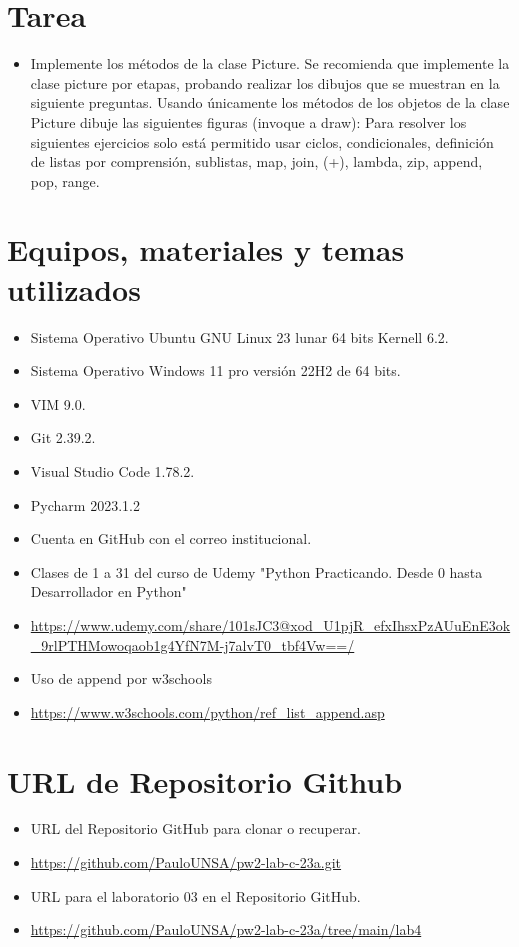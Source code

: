 \documentclass{article}
\begin{document}
	\section{Tarea}
	\begin{itemize}		
		\item  Implemente los métodos de la clase Picture. Se recomienda que implemente la clase picture
		por etapas, probando realizar los dibujos que se muestran en la siguiente preguntas.
		\subitem Usando  únicamente los métodos de los objetos de la clase Picture dibuje las siguientes
		figuras (invoque a draw):
		\subitem Para resolver los siguientes ejercicios solo está permitido usar ciclos, condicionales, definición
		de listas por comprensión, sublistas, map, join, (+), lambda, zip, append, pop, range.
	\end{itemize}
		
	\section{Equipos, materiales y temas utilizados}
	\begin{itemize}
		\item Sistema Operativo Ubuntu GNU Linux 23 lunar 64 bits Kernell 6.2.
		\item Sistema Operativo Windows 11 pro versión 22H2 de 64 bits.
		\item VIM 9.0.
		\item Git 2.39.2.
		\item Visual Studio Code 1.78.2.
		\item Pycharm 2023.1.2
		\item Cuenta en GitHub con el correo institucional.
		\item Clases de 1 a 31 del curso de Udemy "Python Practicando. Desde 0 hasta Desarrollador en Python"
		\item \url{https://www.udemy.com/share/101sJC3@xod_U1pjR_efxIhsxPzAUuEnE3ok_9rlPTHMowoqaob1g4YfN7M-j7alvT0_tbf4Vw==/}
		\item Uso de append por w3schools
		\item \url{https://www.w3schools.com/python/ref_list_append.asp}
	\end{itemize}
	
	\section{URL de Repositorio Github}
	\begin{itemize}
		\item URL del Repositorio GitHub para clonar o recuperar.
		\item \url{https://github.com/PauloUNSA/pw2-lab-c-23a.git}
		\item URL para el laboratorio 03 en el Repositorio GitHub.
		\item \url{https://github.com/PauloUNSA/pw2-lab-c-23a/tree/main/lab4}
	\end{itemize}
	
\end{document}
